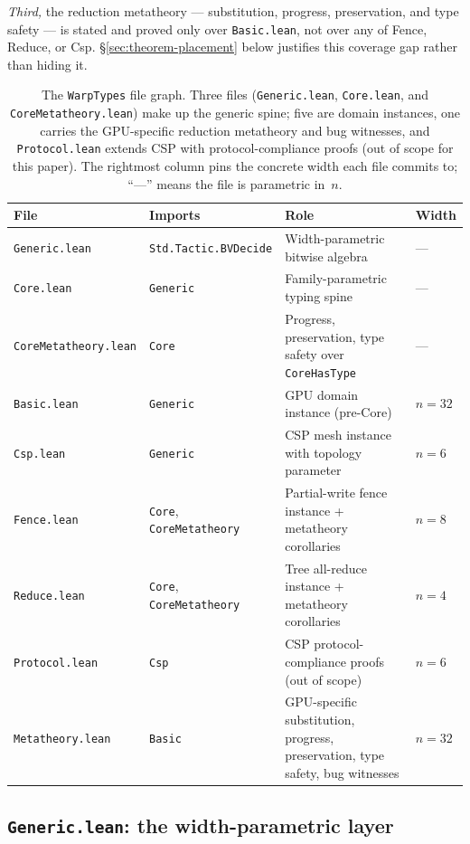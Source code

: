 \documentclass[acmsmall,screen,review,anonymous,nonacm]{acmart}
\newcommand{\CoreHasType}{\texttt{CoreHasType}}
\begin{document}
\emph{Third,} the reduction metatheory --- substitution, progress, preservation, and type safety --- is stated and proved only over \texttt{Basic.lean}, not over any of Fence, Reduce, or Csp. \S\ref{sec:theorem-placement} below justifies this coverage gap rather than hiding it.

\begin{table}[t]
\caption{The \texttt{WarpTypes} file graph. Three files (\texttt{Generic.lean}, \texttt{Core.lean}, and \texttt{CoreMetatheory.lean}) make up the generic spine; five are domain instances, one carries the GPU-specific reduction metatheory and bug witnesses, and \texttt{Protocol.lean} extends CSP with protocol-compliance proofs (out of scope for this paper). The rightmost column pins the concrete width each file commits to; ``---'' means the file is parametric in~$n$.}
\label{fig:file-graph}
\small
\begin{tabular}{@{}llll@{}}
\toprule
File & Imports & Role & Width \\
\midrule
\texttt{Generic.lean} & \texttt{Std.Tactic.BVDecide} & Width-parametric bitwise algebra & --- \\
\texttt{Core.lean} & \texttt{Generic} & Family-parametric typing spine & --- \\
\texttt{CoreMetatheory.lean} & \texttt{Core} & Progress, preservation, type safety over \CoreHasType{} & --- \\
\texttt{Basic.lean} & \texttt{Generic} & GPU domain instance (pre-Core) & $n = 32$ \\
\texttt{Csp.lean} & \texttt{Generic} & CSP mesh instance with topology parameter & $n = 6$ \\
\texttt{Fence.lean} & \texttt{Core}, \texttt{CoreMetatheory} & Partial-write fence instance + metatheory corollaries & $n = 8$ \\
\texttt{Reduce.lean} & \texttt{Core}, \texttt{CoreMetatheory} & Tree all-reduce instance + metatheory corollaries & $n = 4$ \\
\texttt{Protocol.lean} & \texttt{Csp} & CSP protocol-compliance proofs (out of scope) & $n = 6$ \\
\texttt{Metatheory.lean} & \texttt{Basic} & GPU-specific substitution, progress, preservation, type safety, bug witnesses & $n = 32$ \\
\bottomrule
\end{tabular}
\end{table}

\subsection{\texttt{Generic.lean}: the width-parametric layer}\label{sec:generic-lean}
\end{document}
